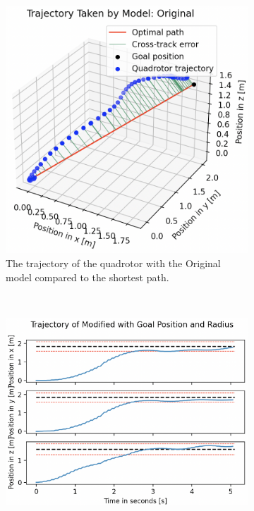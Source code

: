 \begin{figure}[H]
\begin{subfigure}[b]{0.48\textwidth}
         \includegraphics[width=\textwidth]{figures/5_/Testing/ddpg_test_original1.png}
         \caption{The trajectory of the quadrotor with the Original model compared to the shortest path.}
         \label{fig:testing_ddpgOriginal1}
     \end{subfigure} 
     \hfill \\[10mm]
     \begin{subfigure}[b]{0.49\textwidth}
         \centering
         \captionsetup{justification=centering}
         \includegraphics[width=\textwidth]{figures/5_/Testing/ddpg_test_modified2.png}

\end{subfigure}
\end{figure}
